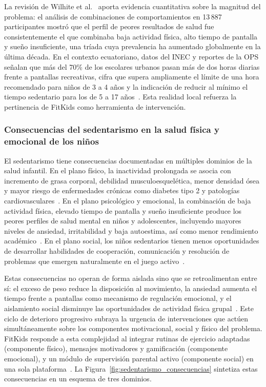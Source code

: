 					La revisión de Wilhite et al.~\cite{Wilhite2023} aporta evidencia cuantitativa sobre la magnitud del problema: el análisis de combinaciones de comportamientos en 13\,887 participantes mostró que el perfil de peores resultados de salud fue consistentemente el que combinaba baja actividad física, alto tiempo de pantalla y sueño insuficiente, una tríada cuya prevalencia ha aumentado globalmente en la última década. En el contexto ecuatoriano, datos del INEC y reportes de la OPS señalan que más del 70\% de los escolares urbanos pasan más de dos horas diarias frente a pantallas recreativas, cifra que supera ampliamente el límite de una hora recomendado para niños de 3 a 4 años y la indicación de reducir al mínimo el tiempo sedentario para los de 5 a 17 años~\cite{Bull2020,UN2015}. Esta realidad local refuerza la pertinencia de FitKids como herramienta de intervención.
					
				\subsubsection{Consecuencias del sedentarismo en la salud física y emocional de los niños}
					El sedentarismo tiene consecuencias documentadas en múltiples dominios de la salud infantil. En el plano físico, la inactividad prolongada se asocia con incremento de grasa corporal, debilidad musculoesquelética, menor densidad ósea y mayor riesgo de enfermedades crónicas como diabetes tipo 2 y patologías cardiovasculares~\cite{Musa2022}. En el plano psicológico y emocional, la combinación de baja actividad física, elevado tiempo de pantalla y sueño insuficiente produce los peores perfiles de salud mental en niños y adolescentes, incluyendo mayores niveles de ansiedad, irritabilidad y baja autoestima, así como menor rendimiento académico~\cite{Wilhite2023}. En el plano social, los niños sedentarios tienen menos oportunidades de desarrollar habilidades de cooperación, comunicación y resolución de problemas que emergen naturalmente en el juego activo~\cite{Hesketh2017}.
					
					Estas consecuencias no operan de forma aislada sino que se retroalimentan entre sí: el exceso de peso reduce la disposición al movimiento, la ansiedad aumenta el tiempo frente a pantallas como mecanismo de regulación emocional, y el aislamiento social disminuye las oportunidades de actividad física grupal~\cite{Musa2022,VegaDiaz2023}. Este ciclo de deterioro progresivo subraya la urgencia de intervenciones que actúen simultáneamente sobre los componentes motivacional, social y físico del problema. FitKids responde a esta complejidad al integrar rutinas de ejercicio adaptadas (componente físico), mensajes motivadores y gamificación (componente emocional), y un módulo de supervisión parental activo (componente social) en una sola plataforma~\cite{WangGamif2025,Yao2015}. La Figura~\ref{fig:sedentarismo_consecuencias} sintetiza estas consecuencias en un esquema de tres dominios.
					
